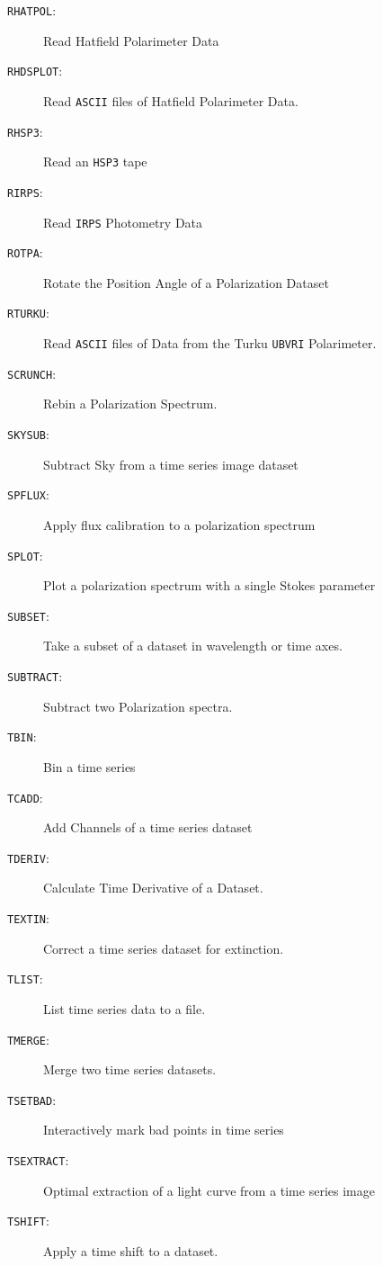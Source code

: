 \documentclass[11pt,twoside,nolof,noabs]{starlink}
\newenvironment{mansectionroutines}{\begin{description}}{\end{description}}
\newcommand{\mansectionitem}[1]{\item[#1:]}
\providecommand{\mantt}[1]{\texttt{#1}}
\begin{document}
\begin{mansectionroutines}
\mansectionitem{{\mantt{RHATPOL}}}
        Read Hatfield Polarimeter Data

\mansectionitem{{\mantt{RHDSPLOT}}}
        Read {\mantt{ASCII}} files of Hatfield Polarimeter Data.

\mansectionitem{{\mantt{RHSP3}}}
        Read an {\mantt{HSP3}} tape

\mansectionitem{{\mantt{RIRPS}}}
        Read {\mantt{IRPS}} Photometry Data

\mansectionitem{{\mantt{ROTPA}}}
        Rotate the Position Angle of a Polarization Dataset

\mansectionitem{{\mantt{RTURKU}}}
        Read {\mantt{ASCII}} files of Data from the Turku {\mantt{UBVRI}} %
Polarimeter.

\mansectionitem{{\mantt{SCRUNCH}}}
        Rebin a Polarization Spectrum.

\mansectionitem{{\mantt{SKYSUB}}}
        Subtract Sky from a time series image dataset

\mansectionitem{{\mantt{SPFLUX}}}
        Apply flux calibration to a polarization spectrum

\mansectionitem{{\mantt{SPLOT}}}
        Plot a polarization spectrum with a single Stokes parameter

\mansectionitem{{\mantt{SUBSET}}}
        Take a subset of a dataset in wavelength or time axes.

\mansectionitem{{\mantt{SUBTRACT}}}
        Subtract two Polarization spectra.

\mansectionitem{{\mantt{TBIN}}}
        Bin a time series

\mansectionitem{{\mantt{TCADD}}}
        Add Channels of a time series dataset

\mansectionitem{{\mantt{TDERIV}}}
        Calculate Time Derivative of a Dataset.

\mansectionitem{{\mantt{TEXTIN}}}
        Correct a time series dataset for extinction.

\mansectionitem{{\mantt{TLIST}}}
        List time series data to a file.

\mansectionitem{{\mantt{TMERGE}}}
        Merge two time series datasets.

\mansectionitem{{\mantt{TSETBAD}}}
        Interactively mark bad points in time series

\mansectionitem{{\mantt{TSEXTRACT}}}
        Optimal extraction of a light curve from a time series image

\mansectionitem{{\mantt{TSHIFT}}}
        Apply a time shift to a dataset.


\end{mansectionroutines}
\end{document}
